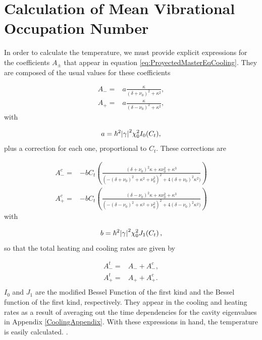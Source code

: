 \documentclass[reprint, amsmath,amssymb, aps,pra]{revtex4-1}
\begin{document}
\section{Calculation of Mean Vibrational Occupation Number}\label{NumCal}

In order to calculate the temperature, we must provide explicit expressions for the coefficients $A_\pm$ that appear in equation \eqref{eq:ProyectedMasterEqCooling}.  They are composed of the usual values for these coefficients\citep{LCNooshi}

\begin{align}
A_- =& a\frac{\kappa}{(\delta+\nu_0)^2+\kappa^2},\\
A_+ =& a\frac{\kappa}{(\delta-\nu_0)^2+\kappa^2},
\end{align} with 

\begin{equation}
a = \hbar^2\abs{\gamma}^2\chi_0^2 I_0(C_t),
\end{equation} plus a correction for each one, proportional to  $C_t$. These corrections are

\begin{align}
A_-^c=& -bC_t(\frac{(\delta+\nu_0)^2\kappa+ \kappa\nu_0^2 + \kappa^3}{(-(\delta+\nu_0)^2+\kappa^2+\nu_0^2)^2+4(\delta+\nu_0)^2\kappa^2)})\\
A_+^c=& -bC_t(\frac{(\delta-\nu_0)^2\kappa+ \kappa\nu_0^2 + \kappa^3}{(-(\delta-\nu_0)^2+\kappa^2+\nu_0^2)^2+4(\delta-\nu_0)^2\kappa^2)})
\end{align} with

\begin{equation}
b= \hbar^2\abs{\gamma}^2\chi_0^2 J_1(C_t)\, ,
\end{equation}
so that the total heating and cooling rates are given by

\begin{align}
A_-^t =& A_- + A_-^c,\\
A_+^t =& A_+ + A_+^c.\\
\end{align}
$I_0$ and $J_1$ are the modified Bessel Function of the first kind and
the Bessel function of the first kind, respectively. They appear in
the cooling and heating rates as a result of averaging out the time
dependencies for the cavity eigenvalues in Appendix
\ref{CoolingAppendix}.
With these expressions in hand, the temperature is easily calculated.
.
\end{document}
